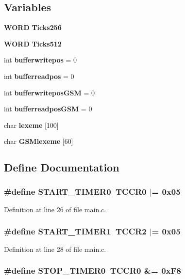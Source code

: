 \subsection*{Variables}
\begin{CompactItemize}
\item 
{\bf WORD} {\bf Ticks256}
\item 
{\bf WORD} {\bf Ticks512}
\item 
int {\bf bufferwritepos} = 0
\item 
int {\bf bufferreadpos} = 0
\item 
int {\bf bufferwriteposGSM} = 0
\item 
int {\bf bufferreadposGSM} = 0
\item 
char {\bf lexeme} [100]
\item 
char {\bf GSMlexeme} [60]
\end{CompactItemize}


\subsection{Define Documentation}
\subsubsection{\setlength{\rightskip}{0pt plus 5cm}\#define START\_\-TIMER0~TCCR0 $|$= 0x05}\label{main_8c_a73e65d02756f59f68216500be1bb072}




Definition at line 26 of file main.c.
\subsubsection{\setlength{\rightskip}{0pt plus 5cm}\#define START\_\-TIMER1~TCCR2 $|$= 0x05}\label{main_8c_7c6627c573a59ceb9c7d42724f0d41dd}




Definition at line 28 of file main.c.
\subsubsection{\setlength{\rightskip}{0pt plus 5cm}\#define STOP\_\-TIMER0~TCCR0 \&= 0xF8}\label{main_8c_fcc3b59aabfce0fdb20fd83b681910a7}




